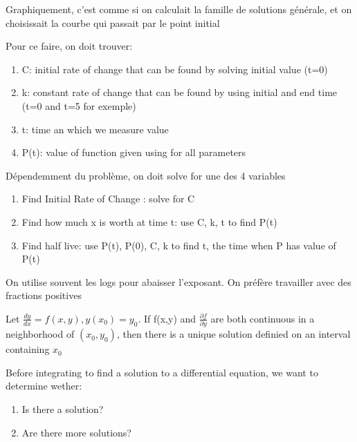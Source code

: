 \documentclass{article}
\begin{document}
\begin{intuition}
    Graphiquement, c'est comme si on calculait la famille de solutions
    générale, et on choisissait la courbe qui passait par le point initial
\end{intuition}

Pour ce faire, on doit trouver:
\begin{enumerate}
    \item C: initial rate of change that can be found by solving
	initial value (t=0)
    \item k: constant rate of change that can be found by using
	initial and end time (t=0 and t=5 for exemple)
    \item t: time an which we measure value
    \item P(t): value of function given using for all parameters
\end{enumerate}

Dépendemment du problème, on doit solve for une des 4 variables
\begin{enumerate}
    \item Find Initial Rate of Change : solve for C
    \item Find how much x is worth at time t: use C, k, t to find P(t)
    \item Find half live: use P(t), P(0), C, k to find t, the time when
	P has value of P(t)
\end{enumerate}

\begin{remark}
    On utilise souvent les logs pour abaisser l'exposant. On préfère
    travailler avec des fractions positives
\end{remark}

\begin{theorem}
    Let $ \frac{dy}{dx}  = f(x,y), y(x_0)=y_0$. If f(x,y) and
    $ \frac{\partial f}{\partial y} $ are both continuous in a
    neighborhood of $(x_0, y_0)$, then there is a unique solution
    definied on an interval containing $x_0$
\end{theorem}

\begin{intuition}
    Before integrating to find a solution to a differential equation,
    we want to determine wether:
    \begin{enumerate}
        \item Is there a solution?
	\item Are there more solutions?
    \end{enumerate}
\end{intuition}
\end{document}
